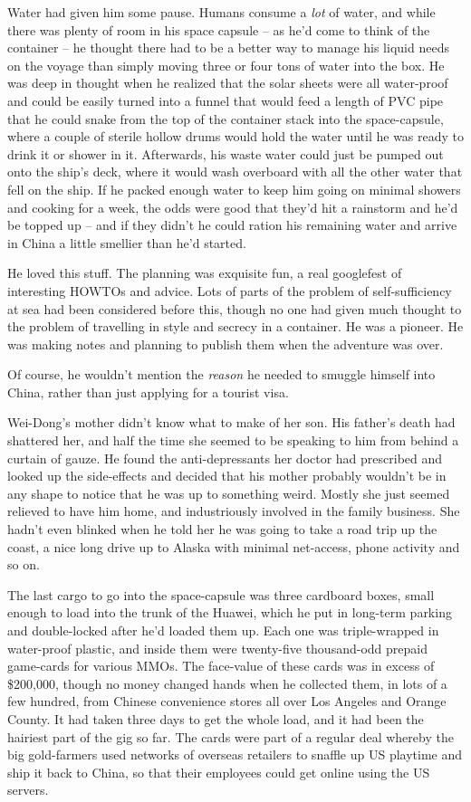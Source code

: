 Water had given him some pause. Humans consume a \emph{lot} of
water, and while there was plenty of room in his space capsule --
as he'd come to think of the container -- he thought there had to
be a better way to manage his liquid needs on the voyage than
simply moving three or four tons of water into the box. He was deep
in thought when he realized that the solar sheets were all
water-proof and could be easily turned into a funnel that would
feed a length of PVC pipe that he could snake from the top of the
container stack into the space-capsule, where a couple of sterile
hollow drums would hold the water until he was ready to drink it or
shower in it. Afterwards, his waste water could just be pumped out
onto the ship's deck, where it would wash overboard with all the
other water that fell on the ship. If he packed enough water to
keep him going on minimal showers and cooking for a week, the odds
were good that they'd hit a rainstorm and he'd be topped up -- and
if they didn't he could ration his remaining water and arrive in
China a little smellier than he'd started.

He loved this stuff. The planning was exquisite fun, a real
googlefest of interesting HOWTOs and advice. Lots of parts of the
problem of self-sufficiency at sea had been considered before this,
though no one had given much thought to the problem of travelling
in style and secrecy in a container. He was a pioneer. He was
making notes and planning to publish them when the adventure was
over.

Of course, he wouldn't mention the \emph{reason} he needed to
smuggle himself into China, rather than just applying for a tourist
visa.

Wei-Dong's mother didn't know what to make of her son. His father's
death had shattered her, and half the time she seemed to be
speaking to him from behind a curtain of gauze. He found the
anti-depressants her doctor had prescribed and looked up the
side-effects and decided that his mother probably wouldn't be in
any shape to notice that he was up to something weird. Mostly she
just seemed relieved to have him home, and industriously involved
in the family business. She hadn't even blinked when he told her he
was going to take a road trip up the coast, a nice long drive up to
Alaska with minimal net-access, phone activity and so on.

The last cargo to go into the space-capsule was three cardboard
boxes, small enough to load into the trunk of the Huawei, which he
put in long-term parking and double-locked after he'd loaded them
up. Each one was triple-wrapped in water-proof plastic, and inside
them were twenty-five thousand-odd prepaid game-cards for various
MMOs. The face-value of these cards was in excess of \$200,000,
though no money changed hands when he collected them, in lots of a
few hundred, from Chinese convenience stores all over Los Angeles
and Orange County. It had taken three days to get the whole load,
and it had been the hairiest part of the gig so far. The cards were
part of a regular deal whereby the big gold-farmers used networks
of overseas retailers to snaffle up US playtime and ship it back to
China, so that their employees could get online using the US
servers.

